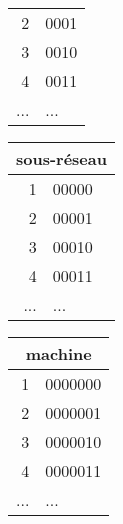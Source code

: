\documentclass{article}
\begin{document}
\begin{resolution}
\begin{definition}
\begin{center}
\begin{minipage}[t]{0.3\textwidth}
\begin{table}[H]
\begin{tabular}{rl}
                        2 & 0001\\
                        3 & 0010\\
                        4 & 0011\\
                        ... & ...\\
                        \hline
                    \end{tabular}
                \end{table}
            \end{minipage}
            \begin{minipage}[t]{0.3\textwidth}
                \begin{table}[H]
                    \centering\begin{tabular}{rl}
                        \multicolumn{2}{c}{\textbf{sous-réseau}}\\
                        \hline
                        1 & 00000\\
                        2 & 00001\\
                        3 & 00010\\
                        4 & 00011\\
                        ... & ...\\
                        \hline
                    \end{tabular}
                \end{table}
            \end{minipage}
            \begin{minipage}[t]{0.3\textwidth}
                \begin{table}[H]
                    \centering\begin{tabular}{rl}
                        \multicolumn{2}{c}{\textbf{machine}}\\
                        \hline
                        1 & 0000000\\
                        2 & 0000001\\
                        3 & 0000010\\
                        4 & 0000011\\
                        ... & ...\\
                        \hline
                    \end{tabular}
                \end{table}
            \end{minipage}
        \end{center}

\end{definition}
\end{resolution}
\end{document}
